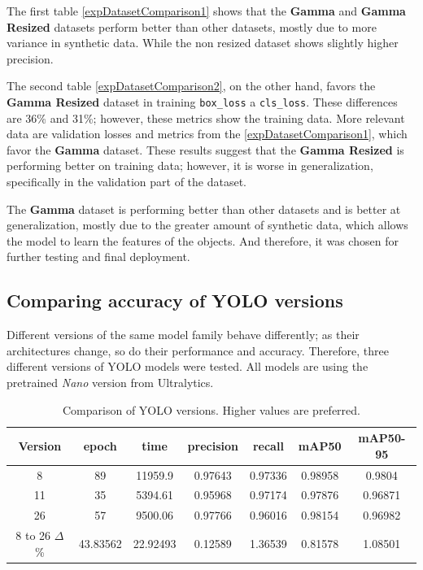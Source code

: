 The first table \ref{expDatasetComparison1} shows that the \textbf{Gamma} and \textbf{Gamma Resized} datasets perform better than other datasets, mostly due to more variance in synthetic data. While the non resized dataset shows slightly higher precision.

The second table \ref{expDatasetComparison2}, on the other hand, favors the \textbf{Gamma Resized} dataset in training \texttt{box\_loss} a \texttt{cls\_loss}. These differences are 36\% and 31\%; however, these metrics show the training data. More relevant data are validation losses and metrics from the \ref{expDatasetComparison1}, which favor the \textbf{Gamma} dataset. These results suggest that the \textbf{Gamma Resized} is performing better on training data; however, it is worse in generalization, specifically in the validation part of the dataset.

The \textbf{Gamma} dataset is performing better than other datasets and is better at generalization, mostly due to the greater amount of synthetic data, which allows the model to learn the features of the objects. And therefore, it was chosen for further testing and final deployment.

\subsection{Comparing accuracy of YOLO versions}
Different versions of the same model family behave differently; as their architectures change, so do their performance and accuracy. Therefore, three different versions of YOLO models were tested. All models are using the pretrained \textit{Nano} version from Ultralytics.

\begin{table}[hbt]
\label{expYoloVersions1}
\caption{Comparison of YOLO versions. Higher values are preferred.}
\centering
\begin{tabular}{|c|c|c|c|c|c|c|}
\hline
Version                  & epoch    & time     & precision & recall  & mAP50   & mAP50-95 \\ \hline
8                               & 89       & 11959.9  & 0.97643   & 0.97336 & 0.98958 & 0.9804   \\ \hline
11                              & 35       & 5394.61  & 0.95968   & 0.97174 & 0.97876 & 0.96871  \\ \hline
26                              & 57       & 9500.06  & 0.97766   & 0.96016 & 0.98154 & 0.96982  \\ \hline
8 to 26 $\Delta$\% & 43.83562 & 22.92493 & 0.12589   & 1.36539 & 0.81578 & 1.08501  \\ \hline
\end{tabular}
\end{table}

